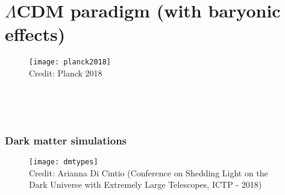 \section{$\Lambda$CDM paradigm (with baryonic effects)}




\begin{frame}
      \begin{figure}
    \centering
    \texttt{[image: planck2018]}\\
     \tiny{Credit: Planck 2018}
  \end{figure}

  
\end{frame}



\begin{frame}
      \begin{figure}
    \centering
    \\
  \end{figure}
  
\end{frame}



\begin{frame}
  \begin{figure}
    \centering
    \def\sdm{0.4}
    \\
  \end{figure}

\end{frame}



\begin{frame}
  \frametitle{Dark matter simulations}
  \begin{figure}
    \centering
    \texttt{[image: dmtypes]}\\
    {\tiny Credit: Arianna Di Cintio (Conference on Shedding Light on the Dark Universe with Extremely Large Telescopes, ICTP - 2018)}
  \end{figure}
\end{frame}

